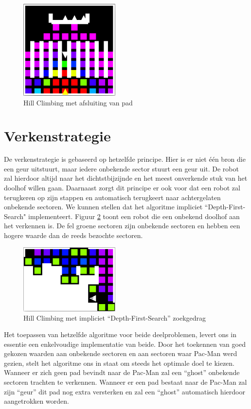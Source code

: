 \documentclass[12pt,a4paper]{report}
\begin{document}
\begin{figure}[htbp]
  \centering
  \includegraphics[width=50mm]{resources/hillclimbing2.png}
  \caption{Hill Climbing met afsluiting van pad}
  \label{fig:hillclimbing2}
\end{figure}

\section{Verkenstrategie}

De verkenstrategie is gebaseerd op hetzelfde principe. Hier is er niet \'e\'en bron die een geur uitstuurt, maar iedere onbekende sector stuurt een geur uit. De robot zal hierdoor altijd naar het dichtstbijzijnde en het meest onverkende stuk van het doolhof willen gaan. Daarnaast zorgt dit principe er ook voor dat een robot zal terugkeren op zijn stappen en automatisch terugkeert naar achtergelaten onbekende sectoren. We kunnen stellen dat het algoritme impliciet ``Depth-First-Search" implementeert. Figuur \ref{fig:dfs} toont een robot die een onbekend doolhof aan het verkennen is. De fel groene sectoren zijn onbekende sectoren en hebben een hogere waarde dan de reeds bezochte sectoren.

\begin{figure}[htbp]
  \centering
  \includegraphics[width=50mm]{resources/dfs.png}
  \caption{Hill Climbing met impliciet ``Depth-First-Search'' zoekgedrag}
  \label{fig:dfs}
\end{figure}

Het toepassen van hetzelfde algoritme voor beide deelproblemen, levert ons in essentie een enkelvoudige implementatie van beide. Door het toekennen van goed gekozen waarden aan onbekende sectoren en aan sectoren waar Pac-Man werd gezien, stelt het algoritme ons in staat om steeds het optimale doel te kiezen. Wanneer er zich geen pad bevindt naar de Pac-Man zal een ``ghost'' onbekende sectoren trachten te verkennen. Wanneer er een pad bestaat naar de Pac-Man zal zijn ``geur'' dit pad nog extra versterken en zal een ``ghost'' automatisch hierdoor aangetrokken worden.
\end{document}
